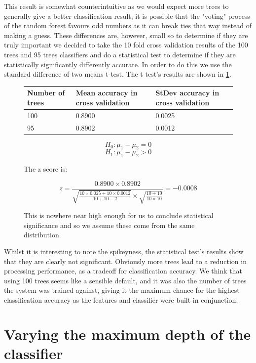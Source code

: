 \documentclass[ %
                    author={Sam Phippen},
                supervisor={Dr. Rafal Bogacz},
                     title={Real time voice activity detectors in noisy personal computing environments},
                  subtitle={},
                    degree={MEng},
                      year={2012} ]{thesis}
\begin{document}
This result is somewhat counterintuitive as we would expect more trees to
generally give a better classification result, it is possible that the "voting"
process of the random forest favours odd numbers as it can break ties that way
instead of making a guess. These differences are, however, small so to
determine if they are truly important we decided to take the 10 fold cross
validation results of the 100 trees and 95 trees classifiers and do a
statistical test to determine if they are statistically significantly
differently accurate. In order to do this we use the standard difference of
two means t-test. The t test's results are shown in \ref{fig:t-test}.

\begin{figure}
    \begin{tabular}{|l|l|l|}
        \hline
        Number of trees & Mean accuracy in cross validation & StDev accuracy in cross validation \\ \hline
        100             & 0.8900                            & 0.0025                             \\ \hline
        95              & 0.8902                            & 0.0012                             \\ \hline
    \end{tabular}

    $$H_0:\mu_1-\mu_2=0$$
    $$H_1:\mu_1-\mu_2>0$$

    The z score is:

    $$z=\frac{0.8900\times0.8902}{\sqrt{\frac{10\times0.025+10\times0.0012}{10+10-2}}\times\sqrt{\frac{10+10}{10\times10}}}=-0.0008$$

    This is nowhere near high enough for us to conclude statistical significance and so we assume these come from the same distribution.

    \label{fig:t-test}

\end{figure}

Whilst it is interesting to note the spikeyness, the statistical test's results
show that they are clearly not significant. Obviously more trees lead to a reduction
in processing performance, as a tradeoff for classification accuracy. We think
that using 100 trees seems like a sensible default, and it was also the number of
trees the system was trained against, giving it the maximum chance for the highest
classification accuracy as the features and classifier were built in conjunction.

\section{Varying the maximum depth of the classifier}
\end{document}

